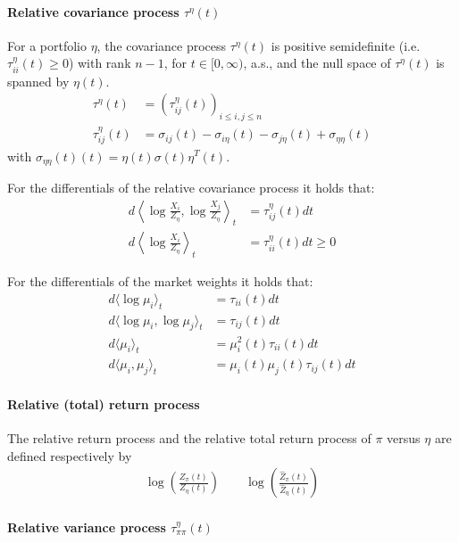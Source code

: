 \documentclass[a4paper,landscape,8pt,fleqn]{scrartcl}
\begin{document}
\begin{multicols*}{3}
\paragraph{Relative covariance process $\tau^\eta(t)$}

For a portfolio $\eta$, the covariance process $\tau^\eta(t)$ is positive semidefinite (i.e. $\tau_{i i}^\eta(t) \geq 0$) with rank $n-1$, for $t \in [0,\infty)$, a.s., and the null space of $\tau^\eta(t)$ is spanned by $\eta(t)$.
\begin{align*}
\tau^\eta(t) &= \left( \tau_{i j}^\eta(t) \right)_{i \leq i, j \leq n} \\
\tau_{i j}^\eta(t) &= \sigma_{i j}(t) - \sigma_{i \eta}(t) - \sigma_{j \eta}(t) + \sigma_{\eta \eta}(t)
\end{align*}
with $\sigma_{\eta \eta}(t)(t) = \eta(t) \sigma(t) \eta^T(t)$.

For the differentials of the relative covariance process it holds that:
\begin{align*}
d \left\langle \log \frac{X_i}{Z_\eta}, \log \frac{X_j}{Z_\eta} \right\rangle_t &= \tau_{ij}^\eta(t) dt \\
d \left\langle \log \frac{X_i}{Z_\eta} \right\rangle_t &= \tau_{ii}^\eta(t) dt \geq 0
\end{align*}

For the differentials of the market weights it holds that:
\begin{align*}
d \langle \log \mu_i \rangle_t &= \tau_{ii}(t) dt \\
d \langle \log \mu_i, \log \mu_j \rangle_t &= \tau_{ij}(t) dt \\
d \langle \mu_i \rangle_t &= \mu_i^2(t) \tau_{ii}(t) dt \\
d \langle \mu_i, \mu_j \rangle_t &= \mu_i(t) \mu_j(t) \tau_{ij}(t) dt
\end{align*}

\paragraph{Relative (total) return process}

The relative return process and the relative total return process of $\pi$ versus $\eta$ are defined respectively by
\begin{align*}
\log \left( \frac{Z_\pi(t)}{Z_\eta(t)} \right) \qquad \log \left( \frac{\hat Z_\pi(t)}{\hat Z_\eta(t)} \right)
\end{align*}

\paragraph{Relative variance process $\tau_{\pi \pi}^\eta(t)$}


\end{multicols*}
\end{document}
